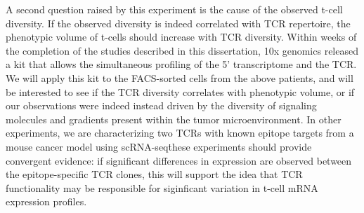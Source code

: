 A second question raised by this experiment is the cause of the observed t-cell diversity. 
If the observed diversity is indeed correlated with TCR repertoire, the phenotypic volume of t-cells should increase with TCR diversity. 
Within weeks of the completion of the studies described in this dissertation, 10x genomics released a kit that allows the simultaneous profiling of the 5' transcriptome and the TCR\@.
We will apply this kit to the FACS-sorted cells from the above patients, and will be interested to see if the TCR diversity correlates with phenotypic volume, or if our observations were indeed instead driven by the diversity of signaling molecules and gradients present within the tumor microenvironment. 
In other experiments, we are characterizing two TCRs with known epitope targets from a mouse cancer model using scRNA-seq\. these experiments should provide convergent evidence: if significant differences in expression are observed between the epitope-specific TCR clones, this will support the idea that TCR functionality may be responsible for siginficant variation in t-cell mRNA expression profiles. 

